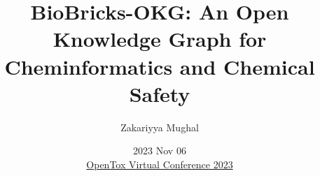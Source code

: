 \title[BioBricks-OKG]{BioBricks-OKG: An Open Knowledge Graph for Cheminformatics and Chemical Safety}
\author[Zaki Mughal]{Zakariyya Mughal}
\date[2023 Nov 06]{2023 Nov 06 \\[1ex]
\href{https://opentox.net/events/virtual-conference-2023/program}{OpenTox Virtual Conference 2023} \\[2ex]
}
%
